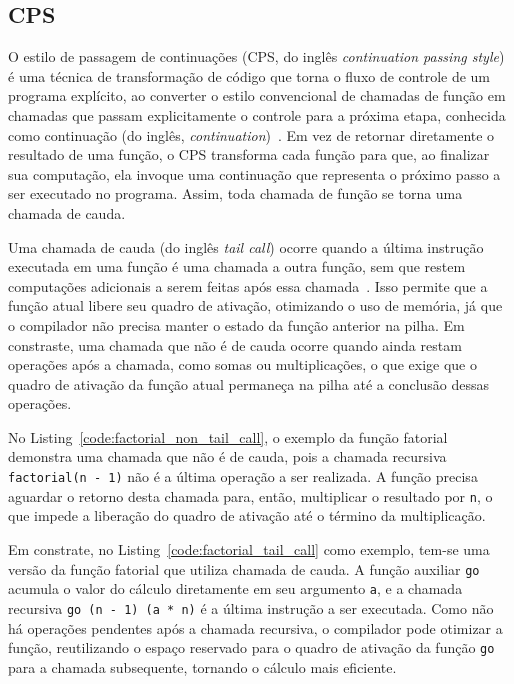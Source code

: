 \subsection{CPS}\label{subsec:cps}

O estilo de passagem de continuações (CPS, do inglês \textit{continuation passing style}) é uma técnica de transformação de código que torna o fluxo de controle de um programa explícito, ao converter o estilo convencional de chamadas de função em chamadas que passam explicitamente o controle para a próxima etapa, conhecida como continuação (do inglês, \textit{continuation})~\cite{appel1992compiling}.
Em vez de retornar diretamente o resultado de uma função, o CPS transforma cada função para que, ao finalizar sua computação, ela invoque uma continuação que representa o próximo passo a ser executado no programa.
Assim, toda chamada de função se torna uma chamada de cauda.

Uma chamada de cauda (do inglês \textit{tail call}) ocorre quando a última instrução executada em uma função é uma chamada a outra função, sem que restem computações adicionais a serem feitas após essa chamada~\cite{muchnick1997advanced}.
Isso permite que a função atual libere seu quadro de ativação, otimizando o uso de memória, já que o compilador não precisa manter o estado da função anterior na pilha.
Em constraste, uma chamada que não é de cauda ocorre quando ainda restam operações após a chamada, como somas ou multiplicações, o que exige que o quadro de ativação da função atual permaneça na pilha até a conclusão dessas operações.

No Listing~\ref{code:factorial_non_tail_call}, o exemplo da função fatorial demonstra uma chamada que não é de cauda, pois a chamada recursiva \texttt{factorial(n - 1)} não é a última operação a ser realizada.
A função precisa aguardar o retorno desta chamada para, então, multiplicar o resultado por \texttt{n}, o que impede a liberação do quadro de ativação até o término da multiplicação.

Em constrate, no Listing~\ref{code:factorial_tail_call} como exemplo, tem-se uma versão da função fatorial que utiliza chamada de cauda.
A função auxiliar \texttt{go} acumula o valor do cálculo diretamente em seu argumento \texttt{a}, e a chamada recursiva \texttt{go (n - 1) (a * n)} é a última instrução a ser executada.
Como não há operações pendentes após a chamada recursiva, o compilador pode otimizar a função, reutilizando o espaço reservado para o quadro de ativação da função \texttt{go} para a chamada subsequente, tornando o cálculo mais eficiente.

